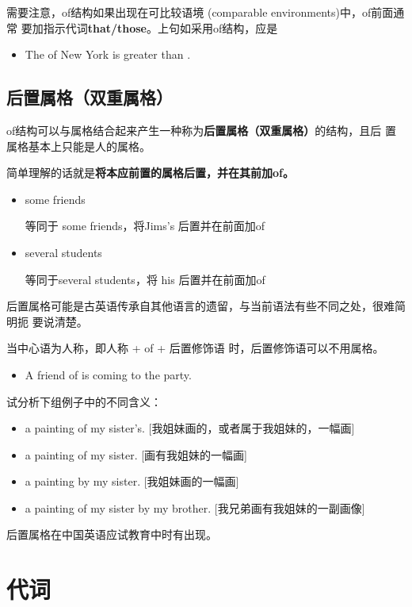 需要注意，of结构如果出现在可比较语境 (comparable environments)中，of前面通常
要加指示代词\textbf{that/those}。上句如采用of结构，应是
\begin{itemize}
\item The  of New York is greater than .
\end{itemize}

\subsection{后置属格（双重属格）}

of结构可以与属格结合起来产生一种称为\textbf{后置属格（双重属格）}的结构，且后
置属格基本上只能是人的属格。

简单理解的话就是\textbf{将本应前置的属格后置，并在其前加of。}

\begin{itemize}
\item some friends 

  等同于 some  friends，将Jims's 后置并在前面加of

\item several students 

  等同于several  students，将 his 后置并在前面加of
\end{itemize}

后置属格可能是古英语传承自其他语言的遗留，与当前语法有些不同之处，很难简明扼
要说清楚。

当中心语为人称，即人称 + of + 后置修饰语 时，后置修饰语可以不用属格。
\begin{itemize}
\item A friend of  is coming to the party.
\end{itemize}

试分析下组例子中的不同含义：
\begin{itemize}
\item a painting of my sister's. [我姐妹画的，或者属于我姐妹的，一幅画]
\item a painting of my sister. [画有我姐妹的一幅画]
\item a painting by my sister. [我姐妹画的一幅画]
\item a painting of my sister by my brother. [我兄弟画有我姐妹的一副画像]
\end{itemize}

后置属格在中国英语应试教育中时有出现。


\section{代词}

